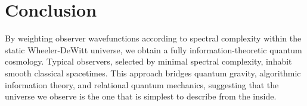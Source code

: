 \documentclass[11pt]{article}
\begin{document}
\section{Conclusion}

By weighting observer wavefunctions according to spectral complexity within the static Wheeler-DeWitt universe, we obtain a fully information-theoretic quantum cosmology.
Typical observers, selected by minimal spectral complexity, inhabit smooth classical spacetimes.
This approach bridges quantum gravity, algorithmic information theory, and relational quantum mechanics, suggesting that the universe we observe is the one that is simplest to describe from the inside.
\end{document}
